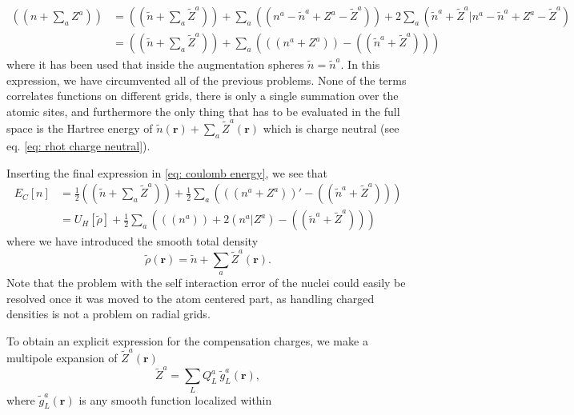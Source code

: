 \documentclass[a4paper]{article}
\newcommand{\s}[1]{\tilde{#1}}
\newcommand{\br}{\mathbf{r}}
\begin{document}
%
\begin{align*}
  ((n+\textstyle\sum_a Z^a)) %
  &= ((\s{n} + \textstyle\sum_a \s{Z}^a)) + \sum_{a}((n^a - \s{n}^a + Z^a - \s{Z}^a)) + 2\sum_a(\s{n}^a+\s{Z}^a|n^a - \s{n}^a + Z^a - \s{Z}^a)\\
  &= ((\s{n} + \textstyle\sum_a \s{Z}^a)) + \sum_{a}\left( ((n^a + Z^a)) - ((\s{n}^a + \s{Z}^a)) \right)
\end{align*}
%
where it has been used that inside the augmentation spheres $\s{n} =
\s{n}^a$. In this expression, we have circumvented all of the previous
problems. None of the terms correlates functions on different grids,
there is only a single summation over the atomic sites, and
furthermore the only thing that has to be evaluated in the full space
is the Hartree energy of $\s{n}(\br) + \sum_a \s{Z}^a(\br)$ which is
charge neutral (see eq. \ref{eq: rhot charge neutral}).
\par Inserting the final expression in \ref{eq: coulomb energy}, we see that
%
\begin{equation}
  \begin{split}
       E_C[n] &=  \frac{1}{2}((\s{n} + {\textstyle\sum_a} \s{Z}^a)) + \frac{1}{2}\sum_a \left(((n^a + Z^a))' - ((\s{n}^a + \s{Z}^a))\right)\\
              &=U_H[\s{\rho}] + \frac{1}{2}\sum_a \left( ((n^a)) + 2(n^a|Z^a) - ((\s{n}^a + \s{Z}^a))\right)
  \end{split}
\end{equation}
%
where we have introduced the smooth total density
%
\begin{equation}
  \s{\rho}(\br) = \s{n} + \sum_a \s{Z}^a(\br).
\end{equation}
%
Note that the problem with the self interaction error of the nuclei
could easily be resolved once it was moved to the atom centered part,
as handling charged densities is not a problem on radial grids.
\par To obtain an explicit expression for the compensation charges, we
make a multipole expansion of $\s{Z}^a(\br)$
%
\begin{equation}\label{eq: compensation expansion}
  \s{Z}^a = \sum_L Q_L^a ~\s{g}_L^a(\br),
\end{equation}
%
where $\s{g}_L^a(\br)$ is any smooth function localized within
\end{document}
